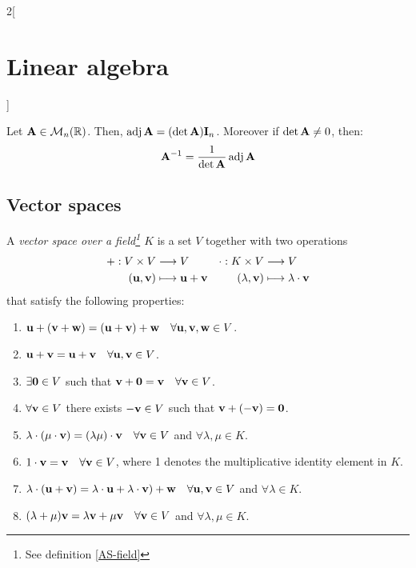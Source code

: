 \documentclass[../../../main.tex]{subfiles}
\begin{document}
\begin{multicols}{2}[\section{Linear algebra}]
\begin{definition}
\end{definition}
\begin{theorem}
    Let $\vb{A}\in\mathcal{M}_n(\mathbb{R})$. Then, $\operatorname{adj}\vb{A}=(\det \vb{A})\vb{I}_n$. Moreover if $\det \vb{A}\ne 0$, then: $$\vb{A}^{-1}=\frac{1}{\det \vb{A}}\operatorname{adj}\vb{A}$$
\end{theorem}
\subsection{Vector spaces}
\begin{definition}
    A \textit{vector space over a field\footnote{See definition \ref{AS-field}} $K$} is a set $V$ together with two operations
    \begin{align*}
        +:V\times V&\longrightarrow V&\cdot:K\times V&\longrightarrow V\\
        (\vb{u},\vb{v})&\longmapsto \vb{u}+ \vb{v}&(\lambda,\vb{v})&\longmapsto \lambda\cdot \vb{v}
    \end{align*}
    that satisfy the following properties:
    \begin{enumerate}
        \item $\vb{u}+(\vb{v}+\vb{w})=(\vb{u}+\vb{v})+\vb{w}\quad\forall\vb{u},\vb{v},\vb{w}\in V$.
        \item $\vb{u}+\vb{v}=\vb{u}+\vb{v}\quad\forall\vb{u},\vb{v}\in V$.
        \item $\exists\vb{0}\in V$ such that $\vb{v}+\vb{0}=\vb{v}\quad\forall\vb{v}\in V$.
        \item $\forall\vb{v}\in V$ there exists $-\vb{v}\in V$ such that $\vb{v}+(-\vb{v})=\vb{0}$.                  
        \item $\lambda\cdot(\mu\cdot\vb{v})=(\lambda\mu)\cdot\vb{v}\quad\forall\vb{v}\in V$ and $\forall\lambda,\mu\in K$. 
        \item $1\cdot\vb{v}=\vb{v}\quad\forall\vb{v}\in V$, where 1 denotes the multiplicative identity element in $K$.
        \item $\lambda\cdot(\vb{u}+\vb{v})=\lambda\cdot\vb{u}+\lambda\cdot\vb{v})+\vb{w}\quad\forall\vb{u},\vb{v}\in V$ and $\forall\lambda\in K$.
        \item $(\lambda+\mu)\vb{v}=\lambda\vb{v}+\mu\vb{v}\quad\forall\vb{v}\in V$ and $\forall\lambda,\mu\in K$.

\end{enumerate}
\end{definition}
\end{multicols}
\end{document}
